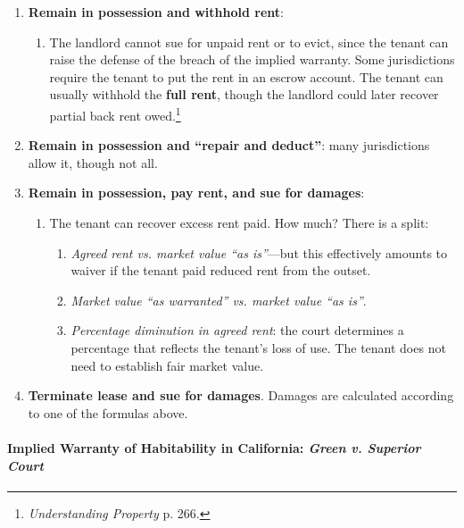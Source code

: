\begin{enumerate}
    \item \textbf{Remain in possession and withhold rent}:
    \begin{enumerate}
        \item The landlord cannot sue for unpaid rent or to evict, since the 
        tenant can raise the defense of the breach of the implied warranty. 
        Some jurisdictions require the tenant to put the rent in an escrow 
        account. The tenant can usually withhold the \textbf{full rent}, 
        though the landlord could later recover partial back rent 
        owed.\footnote{\emph{Understanding Property} p. 266.}
    \end{enumerate}
    \item \textbf{Remain in possession and ``repair and deduct''}: many 
    jurisdictions allow it, though not all.
    \item \textbf{Remain in possession, pay rent, and sue for damages}:
    \begin{enumerate}
        \item The tenant can recover excess rent paid. How much? There is a 
        split:
        \begin{enumerate}
            \item \emph{Agreed rent vs. market value ``as is''}---but this 
            effectively amounts to waiver if the tenant paid reduced rent from 
            the outset.
            \item \emph{Market value ``as warranted'' vs. market value ``as 
            is''}.
            \item \emph{Percentage diminution in agreed rent}: the court 
            determines a percentage that reflects the tenant's loss of use. 
            The tenant does not need to establish fair market value.
        \end{enumerate}
    \end{enumerate}
    \item \textbf{Terminate lease and sue for damages}. Damages are calculated 
    according to one of the formulas above.
\end{enumerate}

\paragraph{Implied Warranty of Habitability in California: \emph{Green v. 
Superior Court}}

